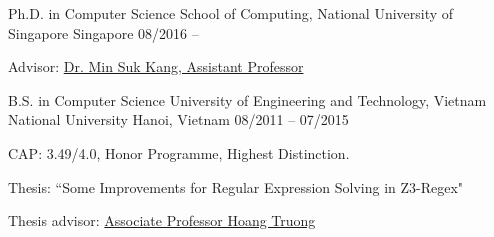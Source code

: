 


\begin{cventries}

  \cventry
    {Ph.D. in Computer Science} %
    {School of Computing, National University of Singapore} %
    {Singapore} %
    {08/2016 -- } %
    {
      \begin{cvitems} %
        \item {Advisor: \href{http://www.comp.nus.edu.sg/~kangms/}{Dr. Min Suk Kang, Assistant Professor}}
      \end{cvitems}
    }

  \cventry
    {B.S. in Computer Science} %
    {University of Engineering and Technology, Vietnam National University} %
    {Hanoi, Vietnam} %
    {08/2011 -- 07/2015} %
    {
      \begin{cvitems} %
        \item {CAP: 3.49/4.0, Honor Programme, Highest Distinction.}
        \item {Thesis: “Some Improvements for Regular Expression Solving in Z3-Regex"}
        \item {Thesis advisor: \href{http://www.uet.vnu.edu.vn/~hoangta/}{Associate Professor Hoang Truong}}
      \end{cvitems}
    }


\end{cventries}
